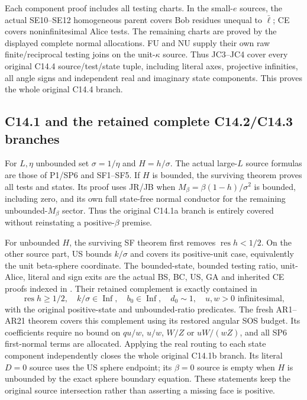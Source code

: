 Each component proof includes all testing charts.  In the small-$e$
sources, the actual SE10--SE12 homogeneous parent covers Bob residues
unequal to $\bar\ell$; CE covers noninfinitesimal Alice tests.
The remaining charts are proved by the displayed complete normal
allocations.  FU and NU supply their own raw finite/reciprocal
testing joins on the unit-$\kappa$ source.  Thus JC3--JC4 cover
every original C14.4 source/test/state tuple, including literal
axes, projective infinities, all angle signs and independent
real and imaginary state components.  This proves the whole
original C14.4 branch.

\subsection{C14.1 and the retained complete C14.2/C14.3 branches}
For $L,\eta$ unbounded set $\sigma=1/\eta$ and $H=h/\sigma$.
The actual large-$L$ source formulas are those of P1/SP6 and SF1--SF5.
If $H$ is bounded, the surviving
 theorem proves
all tests and states.  Its proof uses JR/JB when
$M_\beta=\beta(1-h)/\sigma^2$ is bounded, including zero,
and its own full state-free normal conductor for the remaining
unbounded-$M_\beta$ sector.  Thus the original C14.1a branch is
entirely covered without reinstating a positive-$\beta$ premise.

For unbounded $H$, the surviving SF theorem first removes
$\operatorname{res}h<1/2$.  On the other source part, US bounds
$k/\sigma$ and covers its positive-unit case, equivalently the
unit beta-sphere coordinate.  The bounded-state, bounded testing
ratio, unit-Alice, literal and sign exits are the actual BS, BC,
US, GA and inherited CE proofs indexed in
.  Their retained
complement is exactly contained in
\[
 \operatorname{res}h\ge1/2,\quad k/\sigma\in\operatorname{Inf},
 \quad b_0\in\operatorname{Inf},\quad d_0\sim1,
 \quad u,w>0\text{ infinitesimal},                 \tag{JC5}
\]
with the original positive-state and unbounded-ratio predicates.
The fresh AR1--AR21 theorem covers this complement using its restored
angular SOS budget.  Its coefficients require no bound on
$qu/w$, $u/w$, $W/Z$ or $uW/(wZ)$, and all SP6 first-normal
terms are allocated.  Applying the real routing to each state
component independently closes the whole original C14.1b branch.
Its literal $D=0$ source uses the US sphere endpoint; its
$\beta=0$ source is empty when $H$ is unbounded by the exact sphere
boundary equation.  These statements keep the original source
intersection rather than asserting a missing face is positive.

